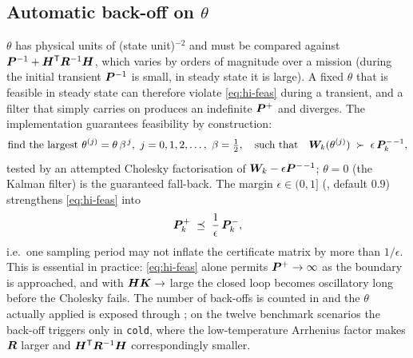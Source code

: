 \subsection{Automatic back-off on $\theta$}
$\theta$ has physical units of (state unit)$^{-2}$ and must be compared against
$\bm{P}^{-1}+\bm{H}^{\mathsf{T}}\bm{R}^{-1}\bm{H}$, which varies by orders of magnitude over a mission (during the
initial transient $\bm{P}^{-1}$ is small, in steady state it is large).  A fixed $\theta$ that is
feasible in steady state can therefore violate \eqref{eq:hi-feas} during a transient, and a filter
that simply carries on produces an indefinite $\bm{P}^{+}$ and diverges.  The implementation
guarantees feasibility by construction:
\begin{equation}
\text{find the largest } \theta^{(j)}=\theta\,\beta^{\,j},\ j=0,1,2,\dots,\ \beta=\tfrac12,
\quad\text{such that}\quad
\bm{W}_k(\theta^{(j)}) \;\succ\; \epsilon\,\bm{P}^{-}_k{}^{-1},
\label{eq:hi-backoff}
\end{equation}
tested by an attempted Cholesky factorisation of
$\bm{W}_k-\epsilon\bm{P}^{-}{}^{-1}$; $\theta=0$ (the Kalman filter) is the guaranteed fall-back.  The
margin $\epsilon\in(0,1]$ (, default $0.9$) strengthens
\eqref{eq:hi-feas} into
\begin{equation}
\bm{P}^{+}_k \;\preceq\; \frac1\epsilon\,\bm{P}^{-}_k ,
\label{eq:hi-margin}
\end{equation}
i.e.\ one sampling period may not inflate the certificate matrix by more than $1/\epsilon$.  This
is essential in practice: \eqref{eq:hi-feas} alone permits $\bm{P}^{+}\to\infty$ as the boundary is
approached, and with $\bm{H}\bm{K}\to$ large the closed loop becomes oscillatory long before the
Cholesky fails.  The number of back-offs is counted in  and the $\theta$
actually applied is exposed through ; on the twelve benchmark scenarios the
back-off triggers only in \texttt{cold}, where the low-temperature Arrhenius factor makes $\bm{R}$
larger and $\bm{H}^{\mathsf{T}}\bm{R}^{-1}\bm{H}$ correspondingly smaller.

